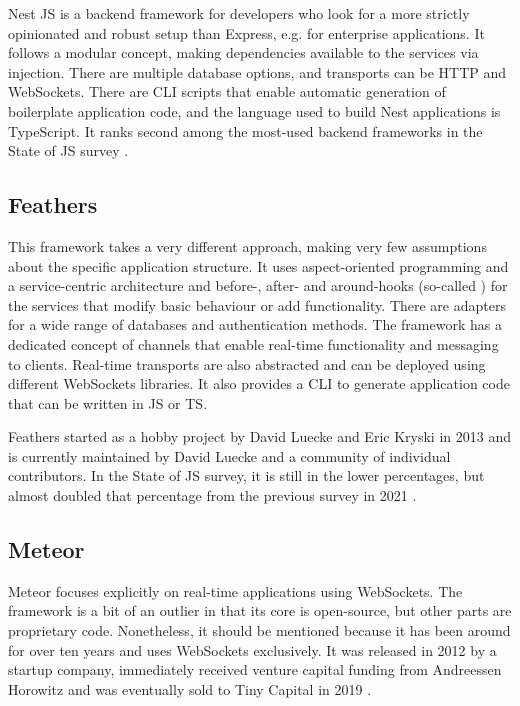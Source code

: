 Nest JS is a backend framework for developers who look for a more strictly opinionated and robust setup than Express, e.g. for enterprise applications. It follows a modular concept, making dependencies available to the services via injection. There are multiple database options, and transports can be HTTP and WebSockets. There are \ac{CLI} scripts that enable automatic generation of boilerplate application code, and the language used to build Nest applications is TypeScript. It ranks second among the most-used backend frameworks in the State of JS survey \parencite{mostUsedBackendFrameworks22}.

\subsection{Feathers}

This framework takes a very different approach, making very few assumptions about the specific application structure. It uses aspect-oriented programming and a service-centric architecture and before-, after- and around-hooks (so-called ) for the services that modify basic behaviour or add functionality. There are adapters for a wide range of databases and authentication methods. The framework has a dedicated concept of channels that enable real-time functionality and messaging to clients. Real-time transports are also abstracted and can be deployed using different WebSockets libraries. It also provides a \ac{CLI} to generate application code that can be written in \ac{JS} or \ac{TS}.

Feathers started as a hobby project by David Luecke and Eric Kryski in 2013 \parencite{feathersFrameworkHistory} and is currently maintained by David Luecke and a community of individual contributors. In the State of JS survey, it is still in the lower percentages, but almost doubled that percentage from the previous survey in 2021 \parencite{mostUsedBackendFrameworks21}.

\subsection{Meteor}

Meteor focuses explicitly on real-time applications using WebSockets. The framework is a bit of an outlier in that its core is open-source, but other parts are proprietary code. Nonetheless, it should be mentioned because it has been around for over ten years and uses WebSockets exclusively. It was released in 2012 by a startup company, immediately received venture capital funding from Andreessen Horowitz and was eventually sold to Tiny Capital in 2019 \parencite{meteorSaleTinyCapital}.

